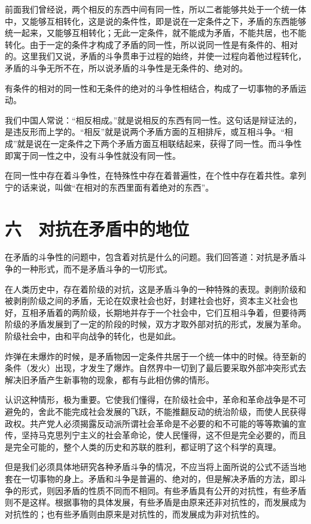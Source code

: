 前面我们曾经说，两个相反的东西中间有同一性，所以二者能够共处于一个统一体中，又能够互相转化，这是说的条件性，即是说在一定条件之下，矛盾的东西能够统一起来，又能够互相转化；无此一定条件，就不能成为矛盾，不能共居，也不能转化。由于一定的条件才构成了矛盾的同一性，所以说同一性是有条件的、相对的。这里我们又说，矛盾的斗争贯串于过程的始终，并使一过程向着他过程转化，矛盾的斗争无所不在，所以说矛盾的斗争性是无条件的、绝对的。

有条件的相对的同一性和无条件的绝对的斗争性相结合，构成了一切事物的矛盾运动。

我们中国人常说：“相反相成。”就是说相反的东西有同一性。这句话是辩证法的，是违反形而上学的。“相反”就是说两个矛盾方面的互相排斥，或互相斗争。“相成”就是说在一定条件之下两个矛盾方面互相联结起来，获得了同一性。而斗争性即寓于同一性之中，没有斗争性就没有同一性。

在同一性中存在着斗争性，在特殊性中存在着普遍性，在个性中存在着共性。拿列宁的话来说，叫做“在相对的东西里面有着绝对的东西”。

\section{六　对抗在矛盾中的地位}

在矛盾的斗争性的问题中，包含着对抗是什么的问题。我们回答道：对抗是矛盾斗争的一种形式，而不是矛盾斗争的一切形式。

在人类历史中，存在着阶级的对抗，这是矛盾斗争的一种特殊的表现。剥削阶级和被剥削阶级之间的矛盾，无论在奴隶社会也好，封建社会也好，资本主义社会也好，互相矛盾着的两阶级，长期地并存于一个社会中，它们互相斗争着，但要待两阶级的矛盾发展到了一定的阶段的时候，双方才取外部对抗的形式，发展为革命。阶级社会中，由和平向战争的转化，也是如此。

炸弹在未爆炸的时候，是矛盾物因一定条件共居于一个统一体中的时候。待至新的条件（发火）出现，才发生了爆炸。自然界中一切到了最后要采取外部冲突形式去解决旧矛盾产生新事物的现象，都有与此相仿佛的情形。

认识这种情形，极为重要。它使我们懂得，在阶级社会中，革命和革命战争是不可避免的，舍此不能完成社会发展的飞跃，不能推翻反动的统治阶级，而使人民获得政权。共产党人必须揭露反动派所谓社会革命是不必要的和不可能的等等欺骗的宣传，坚持马克思列宁主义的社会革命论，使人民懂得，这不但是完全必要的，而且是完全可能的，整个人类的历史和苏联的胜利，都证明了这个科学的真理。

但是我们必须具体地研究各种矛盾斗争的情况，不应当将上面所说的公式不适当地套在一切事物的身上。矛盾和斗争是普遍的、绝对的，但是解决矛盾的方法，即斗争的形式，则因矛盾的性质不同而不相同。有些矛盾具有公开的对抗性，有些矛盾则不是这样。根据事物的具体发展，有些矛盾是由原来还非对抗性的，而发展成为对抗性的；也有些矛盾则由原来是对抗性的，而发展成为非对抗性的。

